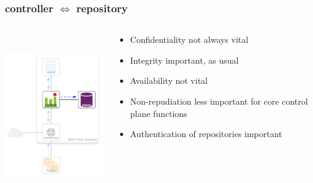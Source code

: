 \documentclass[t,handout]{beamer}
\begin{document}
\begin{frame}
\frametitle{controller $\Longleftrightarrow$ repository}
\begin{columns}[T]
\includegraphics[height=2.75in]{ra-c-r}
\begin{beamerboxesrounded}[shadow]{}
\begin{itemize}
\item {\color{orange} Confidentiality not always vital}
\item {\color{red} Integrity important, as usual}
\item {\color{green} Availability not vital} 
\item {\color{green} Non-repudiation less important for core control plane functions}
\item {\color{red} Authentication of repositories important}
\end{itemize}
\end{beamerboxesrounded}
\end{columns}
\end{frame}
\end{document}
